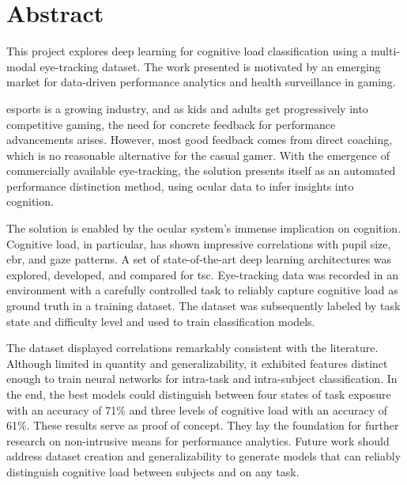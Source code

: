 \chapter*{Abstract}

This project explores deep learning for cognitive load classification using a multi-modal eye-tracking dataset. The work presented is motivated by an emerging market for data-driven performance analytics and health surveillance in gaming.

\acrfull{esports} is a growing industry, and as kids and adults get progressively into competitive gaming, the need for concrete feedback for performance advancements arises. However, most good feedback comes from direct coaching, which is no reasonable alternative for the casual gamer. With the emergence of commercially available eye-tracking, the solution presents itself as an automated performance distinction method, using ocular data to infer insights into cognition. 


The solution is enabled by the ocular system's immense implication on cognition. Cognitive load, in particular, has shown impressive correlations with pupil size, \acrfull{ebr}, and gaze patterns. A set of state-of-the-art deep learning architectures was explored, developed, and compared for \acrfull{tsc}. Eye-tracking data was recorded in an environment with a carefully controlled task to reliably capture cognitive load as ground truth in a training dataset. The dataset was subsequently labeled by task state and difficulty level and used to train classification models.

The dataset displayed correlations remarkably consistent with the literature. Although limited in quantity and generalizability, it exhibited features distinct enough to train neural networks for intra-task and intra-subject classification. In the end, the best models could distinguish between four states of task exposure with an accuracy of 71\% and three levels of cognitive load with an accuracy of 61\%. These results serve as proof of concept. They lay the foundation for further research on non-intrusive means for performance analytics. Future work should address dataset creation and generalizability to generate models that can reliably distinguish cognitive load between subjects and on any task.